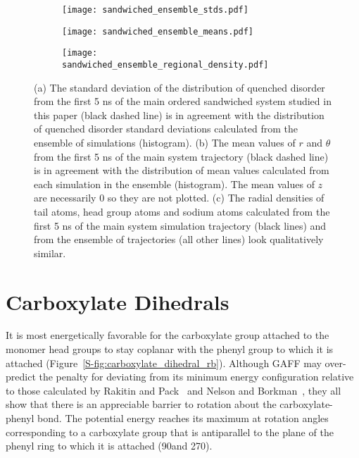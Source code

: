   \begin{figure}[!htb]
  \centering
  \begin{subfigure}{0.49\textwidth}
  \texttt{[image: sandwiched\_ensemble\_stds.pdf]}
  \caption{}\label{S-fig:offset_ensemble_stds}
  \end{subfigure}
  \begin{subfigure}{0.49\textwidth}
  \texttt{[image: sandwiched\_ensemble\_means.pdf]}
  \caption{}\label{S-fig:offset_ensemble_means}
  \end{subfigure}
  \begin{subfigure}{\textwidth}
  \texttt{[image: sandwiched\_ensemble\_regional\_density.pdf]}
  \caption{}\label{S-fig:offset_ensemble_regional_density}
  \end{subfigure}
  \caption{(a) The standard deviation of the distribution of quenched disorder
  from the first 5 ns of the main ordered sandwiched system studied in
  this paper (black dashed line) is in agreement with the distribution of quenched disorder 
  standard deviations calculated from the ensemble of simulations (histogram). 
  (b) The mean values of $r$ and $\theta$ from the first 5 ns of the main
  system trajectory (black dashed line) is in agreement with the distribution of mean values
  calculated from each simulation in the ensemble (histogram). The mean values of $z$
  are necessarily 0 so they are not plotted. (c) The radial densities of tail
  atoms, head group atoms and sodium atoms calculated from the first 5 ns of the
  main system simulation trajectory (black lines) and from the ensemble of 
  trajectories (all other lines) look qualitatively similar.}\label{S-fig:ensemble_stds}
  \end{figure}
  
  \clearpage

  \section{Carboxylate Dihedrals}

  It is most energetically favorable for the carboxylate group attached to the monomer
  head groups to stay coplanar with the phenyl group to which it is attached
  (Figure~\ref{S-fig:carboxylate_dihedral_rb}). Although GAFF may over-predict the penalty
  for deviating from its minimum energy configuration relative to those calculated 
  by Rakitin and Pack~\cite{rakitin_necessity_2005} and Nelson and
  Borkman~\cite{nelson_internal_1998}, they all show that there is an appreciable barrier
  to rotation about the carboxylate-phenyl bond. The potential energy reaches its maximum
  at rotation angles corresponding to a carboxylate group that is antiparallel to the 
  plane of the phenyl ring to which it is attached (90\degree and 270\degree).
  
